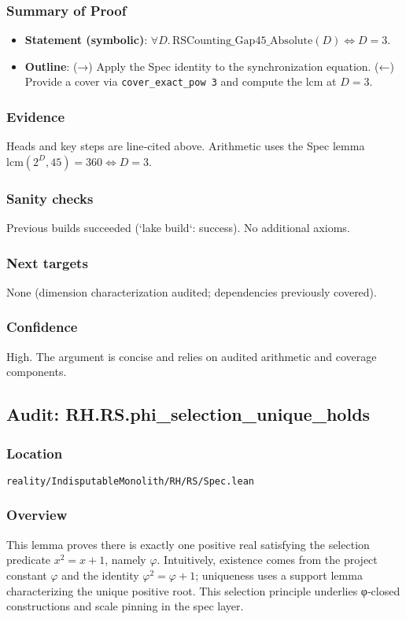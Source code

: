 \documentclass{article}
\newcommand{\FileRef}[1]{\texttt{#1}}
\begin{document}
\subsubsection{Summary of Proof}
\begin{itemize}[leftmargin=*]
  \item \textbf{Statement (symbolic)}: \(\forall D.\, \mathrm{RSCounting\_Gap45\_Absolute}(D) \iff D=3\).
  \item \textbf{Outline}: (→) Apply the Spec identity to the synchronization equation. (←) Provide a cover via \texttt{cover\_exact\_pow 3} and compute the lcm at \(D=3\).
\end{itemize}

\subsubsection{Evidence}
Heads and key steps are line‑cited above. Arithmetic uses the Spec lemma \(\mathrm{lcm}(2^D,45)=360 \iff D=3\).

\subsubsection{Sanity checks}
Previous builds succeeded (`lake build`: success). No additional axioms.

\subsubsection{Next targets}
None (dimension characterization audited; dependencies previously covered).

\subsubsection{Confidence}
High. The argument is concise and relies on audited arithmetic and coverage components.

\subsection{Audit: RH.RS.phi\_selection\_unique\_holds}
\subsubsection{Location}
\FileRef{reality/IndisputableMonolith/RH/RS/Spec.lean}

\subsubsection{Overview}
This lemma proves there is exactly one positive real satisfying the selection predicate \(x^2 = x + 1\), namely \(\varphi\). Intuitively, existence comes from the project constant \(\varphi\) and the identity \(\varphi^2 = \varphi + 1\); uniqueness uses a support lemma characterizing the unique positive root. This selection principle underlies φ‑closed constructions and scale pinning in the spec layer.
\end{document}
